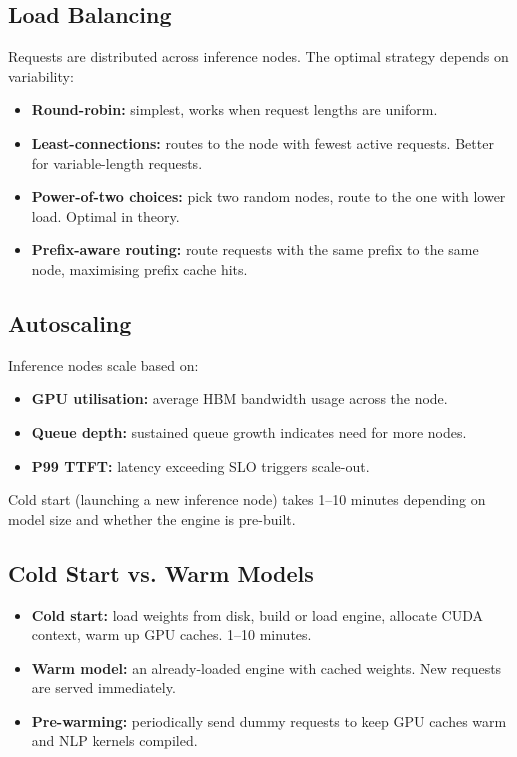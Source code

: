 \documentclass[11pt,a4paper]{article}
\theoremstyle{definition}
\begin{document}
\subsection{Load Balancing}

Requests are distributed across inference nodes. The optimal strategy depends on variability:

\begin{itemize}
	\item \textbf{Round-robin:} simplest, works when request lengths are uniform.
	\item \textbf{Least-connections:} routes to the node with fewest active requests. Better for variable-length requests.
	\item \textbf{Power-of-two choices:} pick two random nodes, route to the one with lower load. Optimal in theory.
	\item \textbf{Prefix-aware routing:} route requests with the same prefix to the same node, maximising prefix cache hits.
\end{itemize}

\subsection{Autoscaling}

Inference nodes scale based on:
\begin{itemize}
	\item \textbf{GPU utilisation:} average HBM bandwidth usage across the node.
	\item \textbf{Queue depth:} sustained queue growth indicates need for more nodes.
	\item \textbf{P99 TTFT:} latency exceeding SLO triggers scale-out.
\end{itemize}

Cold start (launching a new inference node) takes 1--10 minutes depending on model size and whether the engine is pre-built.

\subsection{Cold Start vs. Warm Models}

\begin{itemize}
	\item \textbf{Cold start:} load weights from disk, build or load engine, allocate CUDA context, warm up GPU caches. 1--10 minutes.
	\item \textbf{Warm model:} an already-loaded engine with cached weights. New requests are served immediately.
	\item \textbf{Pre-warming:} periodically send dummy requests to keep GPU caches warm and NLP kernels compiled.
\end{itemize}
\end{document}
